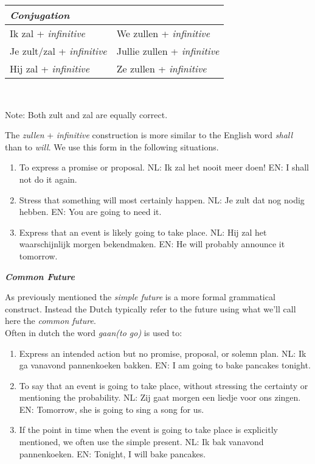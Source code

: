 \documentclass[letterpaper,11pt]{article}
\begin{document}
\begin{tabular}[t]{l l}
    \textit{Conjugation} \\
    \hline
    Ik zal + \textit{infinitive} & We zullen + \textit{infinitive} \\
    Je zult/zal + \textit{infinitive} & Jullie zullen + \textit{infinitive} \\
    Hij zal + \textit{infinitive} & Ze zullen + \textit{infinitive} \\
    \hline
\end{tabular} \\
\begin{tiny}
    Note: Both zult and zal are equally correct.
\end{tiny}
\par{The \textit{zullen} + \textit{infinitive} construction is more similar to the English word \textit{shall} than to
\textit{will}. We use this form in the following situations.}
\begin{enumerate}[topsep=0pt, parsep=0pt, partopsep=0pt, itemsep=0pt]
    \item To express a promise or proposal.
        \subitem \small{NL: Ik zal het nooit meer doen!} 
        \subitem \small{EN: I shall not do it again.} 
    \item Stress that something will most certainly happen.
        \subitem \small{NL: Je zult dat nog nodig hebben.} 
        \subitem \small{EN: You are going to need it.} 
    \item Express that an event is likely going to take place.
        \subitem \small{NL: Hij zal het waarschijnlijk morgen bekendmaken.} 
        \subitem \small{EN: He will probably announce it tomorrow.} 
\end{enumerate}
\textit{\textbf{\small{Common Future}}}
\par{As previously mentioned the \textit{simple future} is a more formal
    grammatical construct. Instead the Dutch typically refer to the future using
what we'll call here the \textit{common future}.}
\\
Often in dutch the word \textit{gaan(to go)} is used to:
\begin{enumerate}[topsep=0pt, parsep=0pt, partopsep=0pt, itemsep=0pt]
    \item Express an intended action but no promise, proposal, or solemn plan.
        \subitem \small{NL: Ik ga vanavond pannenkoeken bakken.} 
        \subitem \small{EN: I am going to bake pancakes tonight.} 
    \item To say that an event is going to take place, without stressing the
        certainty or mentioning the probability.
        \subitem \small{NL: Zij gaat morgen een liedje voor ons zingen.} 
        \subitem \small{EN: Tomorrow, she is going to sing a song for us.} 
    \item If the point in time when the event is going to take place is explicitly
        mentioned, we often use the simple present.
        \subitem \small{NL: Ik bak vanavond pannenkoeken.} 
        \subitem \small{EN: Tonight, I will bake pancakes.} 
\end{enumerate}
\end{document}

